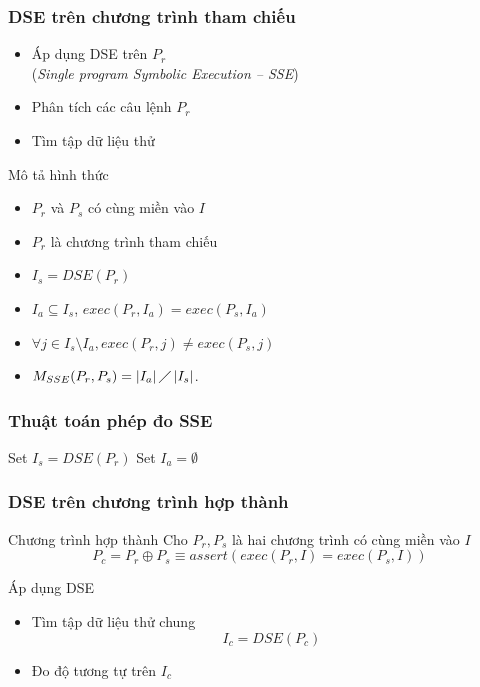\documentclass{beamer}
\begin{document}
\begin{frame}
  \frametitle{DSE trên chương trình tham chiếu}
  \begin{itemize}
  	\item Áp dụng DSE trên $ P_r $ \\ (\emph{Single program Symbolic Execution -- SSE})
  	\item Phân tích các câu lệnh $ P_r $
  	\item Tìm tập dữ liệu thử  	
  \end{itemize}
	\begin{block}{Mô tả hình thức}
	\begin{itemize}
		\item $P_r$ và $P_s$ có cùng miền vào $I$
		\item $P_r$ là chương trình tham chiếu
		\item $I_{s} = DSE(P_r)$
		\item $I_{a} \subseteq I_s$, 
		$exec(P_r, I_a) = exec(P_s, I_a)$
		\item $\forall j \in I_{s} \setminus I_{a}, exec(P_r, j) \neq
		exec(P_s, j)$
		\item $M_{SSE}(P_r, P_s) = \left|I_{a}\right| \diagup
		\left|I_{s}\right| $.
	\end{itemize}
	\end{block}
\end{frame}


\begin{frame}
  \frametitle{Thuật toán phép đo SSE}
  \begin{algorithm}[H]
  	Set $I_s = DSE(P_r)$ \;
  	Set $I_a = \emptyset$ \;
  	{  			
  	}
  \end{algorithm}
\end{frame}

\begin{frame}
\frametitle{DSE trên chương trình hợp thành}
\begin{block}{Chương trình hợp thành}
Cho $ P_{r}, P_{s} $ là hai chương trình có cùng miền vào $ I $
\[ P_{c} = P_{r} \oplus P_{s} \equiv assert(exec(P_{r}, I) = exec(P_{s}, I)) \]
\end{block}
\begin{block}{Áp dụng DSE}
\begin{itemize}
	\item Tìm tập dữ liệu thử chung 
	\[ I_{c} = DSE(P_{c}) \]
	\item Đo độ tương tự trên $ I_c $
\end{itemize}
\end{block}
\end{frame}
\end{document}
